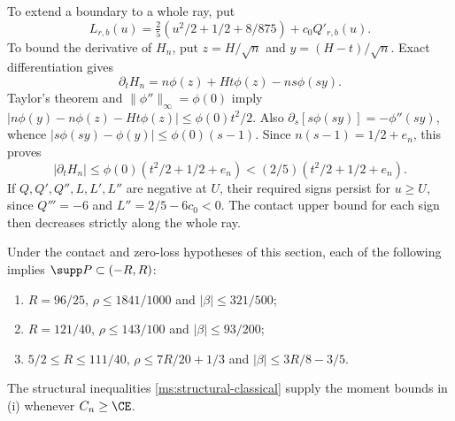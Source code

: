 To extend a boundary to a whole ray, put
\[
 L_{r,b}(u)=\tfrac25(u^2/2+1/2+8/875)+c_0Q'_{r,b}(u).
\]
To bound the derivative of $H_n$, put
$z=H/\sqrt n$ and $y=(H-t)/\sqrt n$. Exact differentiation gives
\[
 \partial_tH_n=n\phi(z)+Ht\phi(z)-ns\phi(sy).
\]
Taylor's theorem and $\|\phi''\|_\infty=\phi(0)$ imply
$|n\phi(y)-n\phi(z)-Ht\phi(z)|\le\phi(0)t^2/2$.
Also $\partial_s[s\phi(sy)]=-\phi''(sy)$, whence
$|s\phi(sy)-\phi(y)|\le\phi(0)(s-1)$. Since
$n(s-1)=1/2+e_n$, this proves
\[
 |\partial_tH_n|\le\phi(0)(t^2/2+1/2+e_n)
                    <(2/5)(t^2/2+1/2+e_n).
\]
If $Q,Q',Q'',L,L',L''$ are negative at $U$, their required signs persist
for $u\ge U$, since $Q'''=-6$ and $L''=2/5-6c_0<0$.
The contact upper bound for each sign then decreases strictly along the
whole ray.

\begin{proposition}\label{ms:04:three-bounds}
Under the contact and zero-loss hypotheses of this section, each of the
following implies $\supp P\subset(-R,R)$:
\begin{enumerate}[label=\textup{(\roman*)}]
\item $R=96/25$, $\rho\le1841/1000$ and $|\beta|\le321/500$;
\item $R=121/40$, $\rho\le143/100$ and $|\beta|\le93/200$;
\item $5/2\le R\le111/40$,
      $\rho\le7R/20+1/3$ and $|\beta|\le3R/8-3/5$.
\end{enumerate}
The structural inequalities \eqref{ms:structural-classical} supply the
moment bounds in \textup{(i)} whenever $C_n\ge\CE$.
\end{proposition}
